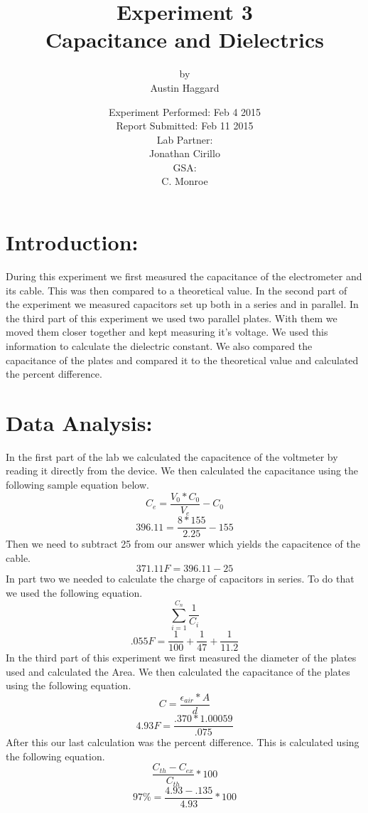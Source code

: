 \documentclass{article}
\title{Experiment 3 \\ Capacitance and Dielectrics}
\author{by \\ Austin Haggard}
\date{
	Experiment Performed: Feb 4 2015 \\
	Report Submitted: Feb 11 2015\\[11pt]
	Lab Partner: \\ Jonathan Cirillo \\[11pt] 
	GSA: \\ C. Monroe
}
\begin{document}
\maketitle
\thispagestyle{empty}
\newpage

\section*{Introduction:}
\setcounter{page}{1}
During this experiment we first measured the capacitance of the electrometer and its cable.  This was then compared to a theoretical value.  In the second part of the experiment we measured capacitors set up both in a series and in parallel.  In the third part of this experiment we used two parallel plates.  With them we moved them closer together and kept measuring it's voltage.  We used this information to calculate the dielectric constant.  We also compared the capacitance of the plates and compared it to the theoretical value and calculated the percent difference.   
\newpage


\section*{Data Analysis:}
\setcounter{page}{3}
In the first part of the lab we calculated the capacitence of the voltmeter by reading it directly from the device.  We then calculated the capacitance using the following sample equation below.
\[C_e = \frac{V_0*C_0}{V_e}-C_0 \] \[396.11 = \frac{8 * 155}{2.25} - 155\]
Then we need to subtract 25 from our answer which yields the capacitence of the cable.
\[371.11F = 396.11 - 25\]
In part two we needed to calculate the charge of capacitors in series.  To do that we used the following equation.
\[\sum_{i = 1}^{C_n}\frac{1}{C_i}\] \[.055F = \frac{1}{100} + \frac{1}{47} + \frac{1}{11.2}\]
In the third part of this experiment we first measured the diameter of the plates used and calculated the Area.  We then calculated the capacitance of the plates using the following equation.
\[C = \frac{\epsilon_{air} * A}{d}\]
\[4.93F = \frac{.370 * 1.00059}{.075}\]
After this our last calculation was the percent difference.  This is calculated using the following equation.
\[\frac{C_{th} - C_{ex}}{C_{th}} * 100\]
\[97\% = \frac{4.93 - .135}{4.93} * 100\]
\newpage
\end{document}
